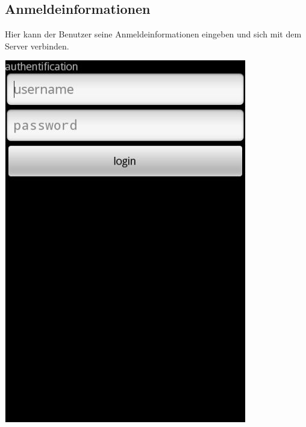 \documentclass[a4paper,10pt,titlepage]{article}
\begin{document}
\subsection{Anmeldeinformationen}
Hier kann der Benutzer seine Anmeldeinformationen eingeben und sich mit dem Server verbinden.
\begin {center}
\includegraphics[scale=0.35]{media/android/login.jpg}
\end {center}
\end{document}
